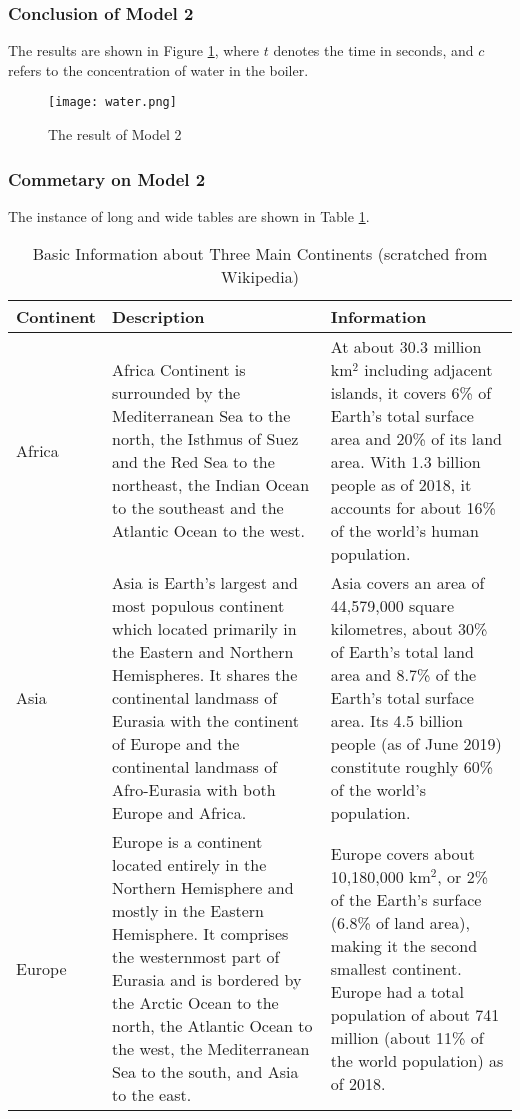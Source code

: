 \documentclass[12pt]{article}  %
\begin{document}
\subsubsection{Conclusion of Model 2}
The results are shown in Figure \ref{fig:result}, where $t$ denotes the time in seconds, and $c$ refers to the concentration of water in the boiler.

\begin{figure}[htbp]
\centering
\texttt{[image: water.png]}
\caption{The result of Model 2}\label{fig:result}
\end{figure}

\subsubsection{Commetary on Model 2}
The instance of long and wide tables are shown in Table \ref{tb:longtable}.

\begin{longtable}{ p{4em} p{14em} p{14em} }
\caption{Basic Information about Three Main Continents (scratched from Wikipedia)}
\label{tb:longtable}\\
\toprule
Continent & Description & Information \\
\midrule
Africa & Africa Continent is surrounded by the Mediterranean Sea to the
north, the Isthmus of Suez and the Red Sea to the northeast, the Indian
Ocean to the southeast and the Atlantic Ocean to the west. &
At about 30.3 million km$^2$ including adjacent islands, it covers 6\%
of Earth's total surface area and 20\% of its land area. With 1.3
billion people as of 2018, it accounts for about 16\% of the world's
human population. \\
\midrule
Asia & Asia is Earth's largest and most populous continent which
located primarily in the Eastern and Northern Hemispheres.
It shares the continental landmass of Eurasia with the continent
of Europe and the continental landmass of Afro-Eurasia with both
Europe and Africa. &
Asia covers an area of 44,579,000 square kilometres, about 30\%
of Earth's total land area and 8.7\% of the Earth's total surface
area. Its 4.5 billion people (as of June 2019) constitute roughly
60\% of the world's population. \\
\midrule
Europe & Europe is a continent located entirely in the Northern
Hemisphere and mostly in the Eastern Hemisphere. It comprises the
westernmost part of Eurasia and is bordered by the Arctic Ocean to
the north, the Atlantic Ocean to the west, the Mediterranean Sea to
the south, and Asia to the east. &
Europe covers about 10,180,000 km$^2$, or 2\% of the Earth's surface
(6.8\% of land area), making it the second smallest
continent. Europe had a total population of about 741 million (about
11\% of the world population) as of 2018. \\
\bottomrule
\end{longtable}
\end{document}
